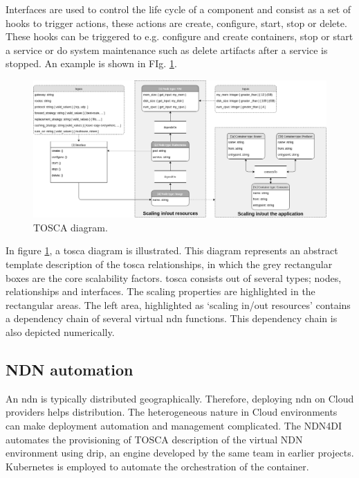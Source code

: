 \documentclass[conference]{IEEEtran}
\begin{document}
 Interfaces are used to control the life cycle of a component and consist as a set of hooks to trigger actions, these actions are create, configure, start, stop or delete. These hooks can be triggered to e.g. configure and create containers, stop or start a service or do system maintenance such as delete artifacts after a service is stopped. An example is shown in FIg. \ref{fig:tosca-diagram}.
\begin{figure}[ht]
\centering
\includegraphics[width=\textwidth]{images/tosca-diagram.png}
\caption{TOSCA diagram.}
\label{fig:tosca-diagram}
\end{figure}
In figure \ref{fig:tosca-diagram}, a \gls{tosca} diagram is illustrated. This diagram represents an abstract template description of the \gls{tosca} relationships, in which the grey rectangular boxes are the core scalability factors. \gls{tosca} consists out of several types; nodes, relationships and interfaces. The scaling properties are highlighted in the rectangular areas. The left area, highlighted as `scaling in/out resources' contains a dependency chain of several virtual \gls{ndn} functions. This dependency chain is also depicted numerically.


\subsection{NDN automation}

An \gls{ndn} is typically distributed geographically. Therefore, deploying \gls{ndn} on Cloud providers helps distribution. The heterogeneous nature in Cloud environments can make deployment automation and management complicated.  The NDN4DI automates the provisioning of TOSCA description of the virtual NDN environment  using \gls{drip}, an engine developed by the same team in earlier projects. Kubernetes is employed to automate the orchestration of the container. 
\end{document}
